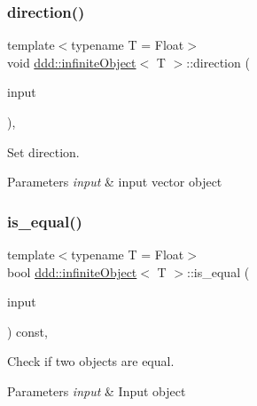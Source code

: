 \subsubsection{\texorpdfstring{direction()}{direction()}}
{\footnotesize\ttfamily template$<$typename T = Float$>$ \\
void \hyperlink{classddd_1_1infinite_object}{ddd\+::infinite\+Object}$<$ T $>$\+::direction (\begin{DoxyParamCaption}\item[{const \hyperlink{classddd_1_1vector}{vector}$<$ T $>$ \&}]{input }\end{DoxyParamCaption})\hspace{0.3cm}{\ttfamily [inline]}, {\ttfamily [inherited]}}



Set direction. 


\begin{DoxyParams}{Parameters}
{\em input} & input vector object \\
\hline
\end{DoxyParams}
\mbox{\label{classddd_1_1infinite_object_a64089c7dadb2ec0b414b155f5bd43339}} 
\subsubsection{\texorpdfstring{is\+\_\+equal()}{is\_equal()}}
{\footnotesize\ttfamily template$<$typename T = Float$>$ \\
bool \hyperlink{classddd_1_1infinite_object}{ddd\+::infinite\+Object}$<$ T $>$\+::is\+\_\+equal (\begin{DoxyParamCaption}\item[{const \hyperlink{classddd_1_1infinite_object}{infinite\+Object}$<$ T $>$ \&}]{input }\end{DoxyParamCaption}) const\hspace{0.3cm}{\ttfamily [inline]}, {\ttfamily [inherited]}}



Check if two objects are equal. 


\begin{DoxyParams}{Parameters}
{\em input} & Input object \\
\hline
\end{DoxyParams}
\mbox{\label{classddd_1_1infinite_object_a1dbf3e37dc6f146f089c4c63c4704329}} 
